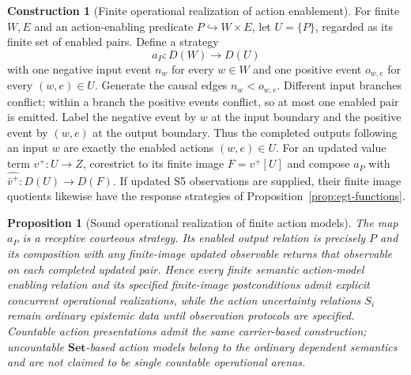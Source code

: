 \documentclass[11pt,a4paper]{article}
\numberwithin{equation}{section}
\newtheorem{proposition}[theorem]{Proposition}
\theoremstyle{definition}
\newtheorem{construction}[construction]{Construction}
\theoremstyle{remark}
\theoremstyle{plain}
\begin{document}
\begin{construction}[Finite operational realization of action enablement]
\label{con:egt-finite-action-enablement}
For finite $W,E$ and an action-enabling predicate
$P\hookrightarrow W\times E$, let $U=\{P\}$, regarded as its finite
set of enabled pairs. Define a strategy
\[
 a_P:D(W)\longrightarrow D(U)
\]
with one negative input event $n_w$ for every $w\in W$ and one
positive event $o_{w,e}$ for every $(w,e)\in U$. Generate the causal
edges $n_w<o_{w,e}$. Different input branches conflict; within a
branch the positive events conflict, so at most one enabled pair is
emitted. Label the negative event by $w$ at the input boundary and
the positive event by $(w,e)$ at the output boundary. Thus the
completed outputs following an input $w$ are exactly the enabled
actions $(w,e)\in U$. For an updated value term $v^+:U\to Z$,
corestrict to its finite image $F=v^+[U]$ and compose $a_P$ with
$\widehat{\bar v^+}:D(U)\to D(F)$. If updated S5 observations are
supplied, their finite image quotients likewise have the response
strategies of Proposition~\ref{prop:egt-functions}.
\end{construction}

\begin{proposition}[Sound operational realization of finite action models]
\label{prop:egt-finite-action-enablement}
The map $a_P$ is a receptive courteous strategy. Its enabled output
relation is precisely $P$ and its composition with any finite-image
updated observable returns that observable on each completed updated
pair. Hence every finite semantic action-model enabling relation and
its specified finite-image postconditions admit explicit concurrent
operational realizations, while the action uncertainty relations
$S_i$ remain ordinary epistemic data until observation protocols are
specified. Countable action presentations admit the same carrier-based
construction; uncountable $\mathbf{Set}$-based action models belong to
the ordinary dependent semantics and are not claimed to be single
countable operational arenas.
\end{proposition}
\end{document}
